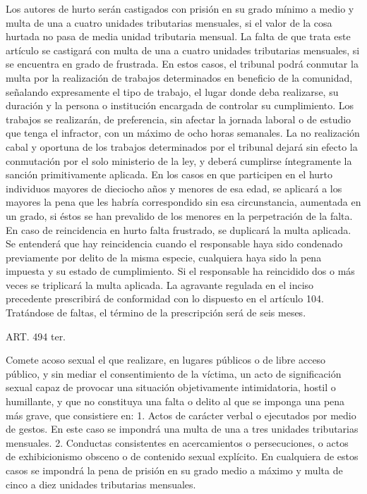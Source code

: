    Los autores de hurto serán castigados con prisión en su grado mínimo a medio y multa de una a cuatro unidades tributarias mensuales, si el valor de la cosa hurtada no pasa de media unidad tributaria mensual.
    La falta de que trata este artículo se castigará con multa de una a cuatro unidades tributarias mensuales, si se encuentra en grado de frustrada. En estos casos, el tribunal podrá conmutar la multa por la realización de trabajos determinados en beneficio de la comunidad, señalando expresamente el tipo de trabajo, el lugar donde deba realizarse, su duración y la persona o institución encargada de controlar su cumplimiento. Los trabajos se realizarán, de preferencia, sin afectar la jornada laboral o de estudio que tenga el infractor, con un máximo de ocho horas semanales. La no realización cabal y oportuna de los trabajos determinados por el tribunal dejará sin efecto la conmutación por el solo ministerio de la ley, y deberá cumplirse íntegramente la sanción primitivamente aplicada.
    En los casos en que participen en el hurto individuos mayores de dieciocho años y menores de esa edad, se aplicará a los mayores la pena que les habría correspondido sin esa circunstancia, aumentada en un grado, si éstos se han prevalido de los menores en la perpetración de la falta.
    En caso de reincidencia en hurto falta frustrado, se duplicará la multa aplicada. Se entenderá que hay reincidencia cuando el responsable haya sido condenado previamente por delito de la misma especie, cualquiera haya sido la pena impuesta y su estado de cumplimiento. Si el responsable ha reincidido dos o más veces se triplicará la multa aplicada.
    La agravante regulada en el inciso precedente prescribirá de conformidad con lo dispuesto en el artículo 104. Tratándose de faltas, el término de la prescripción será de seis meses.


    ART. 494 ter.

    Comete acoso sexual el que realizare, en lugares públicos o de libre acceso público, y sin mediar el consentimiento de la víctima, un acto de significación sexual capaz de provocar una situación objetivamente intimidatoria, hostil o humillante, y que no constituya una falta o delito al que se imponga una pena más grave, que consistiere en:
    1. Actos de carácter verbal o ejecutados por medio de gestos. En este caso se impondrá una multa de una a tres unidades tributarias mensuales.
    2. Conductas consistentes en acercamientos o persecuciones, o actos de exhibicionismo obsceno o de contenido sexual explícito. En cualquiera de estos casos se impondrá la pena de prisión en su grado medio a máximo y multa de cinco a diez unidades tributarias mensuales.



